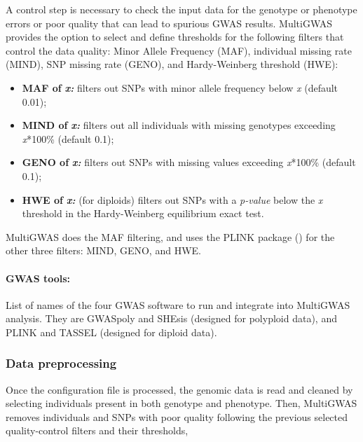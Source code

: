 \documentclass{article}
\begin{document}
A control step is necessary to check the input data for the genotype or phenotype errors or poor quality that can lead to spurious GWAS results. MultiGWAS provides the option to select and define thresholds for the following filters that control the data quality: Minor Allele Frequency (MAF), individual missing rate (MIND), SNP missing rate (GENO), and Hardy-Weinberg threshold (HWE):
\begin{itemize}
\item \textbf{MAF of }\textbf{\emph{x:}} filters out SNPs with minor allele frequency below \emph{x} (default 0.01); 
\item \textbf{MIND of }\textbf{\emph{x:}} filters out all individuals with missing genotypes exceeding \emph{x}{*}100\% (default 0.1); 
\item \textbf{GENO of }\textbf{\emph{x:}} filters out SNPs with missing values exceeding \emph{x}{*}100\% (default 0.1); 
\item \textbf{HWE of }\textbf{\emph{x:}} (for diploids) filters out SNPs with a \emph{p-value} below the \emph{x} threshold in the Hardy-Weinberg equilibrium exact test.

\end{itemize}
MultiGWAS does the MAF filtering, and uses the PLINK package (\cite{Gumpinger2018}) for the other three filters: MIND, GENO, and HWE.

\paragraph{{GWAS tools:}}
List of names of the four GWAS software to run and integrate into MultiGWAS analysis. They are GWASpoly and SHEsis (designed for polyploid data), and PLINK and TASSEL (designed for diploid data). 

\subsubsection{Data preprocessing}

Once the configuration file is processed, the genomic data is read and cleaned by selecting individuals present in both genotype and phenotype. Then, MultiGWAS removes individuals and SNPs with poor quality following the previous selected quality-control filters and their thresholds, 
\end{document}
